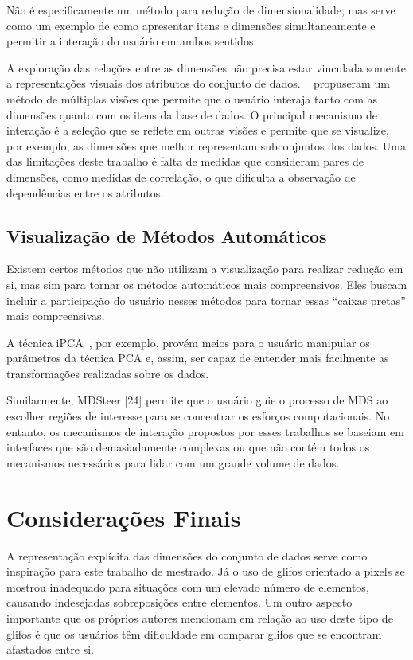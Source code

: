 
Não é especificamente um método para redução de dimensionalidade, mas serve como um exemplo de como apresentar itens e dimensões simultaneamente e permitir a interação do usuário em ambos sentidos.

A exploração das relações entre as dimensões não precisa estar vinculada somente a representações visuais dos atributos do conjunto de dados. \citeauthor{Turkay2011}~\cite{Turkay2011} propuseram um método de múltiplas visões que permite que o usuário interaja tanto com as dimensões quanto com os itens da base de dados. O principal mecanismo de interação é a seleção que se reflete em outras visões e permite que se visualize, por exemplo, as dimensões que melhor representam subconjuntos dos dados. Uma das limitações deste trabalho é falta de medidas que consideram pares de dimensões, como medidas de correlação, o que dificulta a observação de dependências entre os atributos.  

\subsection{Visualização de Métodos Automáticos}

Existem certos métodos que não utilizam a visualização para realizar redução em si, mas sim para tornar os métodos automáticos mais compreensivos. Eles buscam incluir a participação do usuário nesses métodos para tornar essas ``caixas pretas'' mais compreensivas. 

A técnica iPCA~\cite{Jeong2009}, por exemplo, provém meios para o usuário manipular os parâmetros da técnica PCA e, assim, ser capaz de entender mais facilmente as transformações realizadas sobre os dados. 

Similarmente, MDSteer [24] permite que o usuário guie o processo de MDS ao escolher regiões de interesse para se concentrar os esforços computacionais. No entanto, os mecanismos de interação propostos por esses trabalhos se baseiam em interfaces que são demasiadamente complexas ou que não contém todos os mecanismos necessários para lidar com um grande volume de dados.

\section{Considerações Finais}

A representação explícita das dimensões do conjunto de dados serve como inspiração para este trabalho de mestrado. Já o uso de glifos orientado a pixels se mostrou inadequado para situações com um elevado número de elementos, causando indesejadas sobreposições entre elementos. Um outro aspecto importante que os próprios autores mencionam em relação ao uso deste tipo de  glifos é que os usuários têm dificuldade em comparar glifos que se encontram afastados entre si. 

